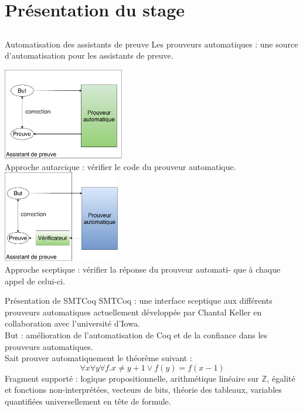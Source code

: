 \documentclass{beamer}
\begin{document}
\section{Présentation du stage}

\subsection{}

\begin{frame}{Automatisation des assistants de preuve}
Les prouveurs automatiques : une source d'automatisation pour les assistants de preuve.
\begin{multicols}{2}
\includegraphics[height=4cm]{1_Autarcique.pdf}\\
Approche autarcique : vérifier le code du prouveur automatique.
\includegraphics[height=4cm]{2_Sceptique.pdf}\\
Approche sceptique : vérifier la réponse du prouveur automati- que à chaque appel de celui-ci.
\end{multicols}
\end{frame}

\begin{frame}{Présentation de SMTCoq}
SMTCoq : une interface sceptique aux différents prouveurs automatiques actuellement développée par Chantal Keller en collaboration avec l'université d'Iowa. \\
\vspace*{7mm}
But : amélioration de l'automatisation de Coq et de la confiance dans les prouveurs automatiques. \\
\vspace*{7mm}
Sait prouver automatiquement le théorème suivant :
\[ \forall x \forall y \forall f. x \neq y + 1 \vee f(y) = f(x-1) \]
Fragment supporté : logique propositionnelle, arithmétique linéaire sur $\mathbb{Z}$, égalité et fonctions non-interprétées, vecteurs de bits, théorie des tableaux, variables quantifiées universellement en tête de formule.

\end{frame}
\end{document}
